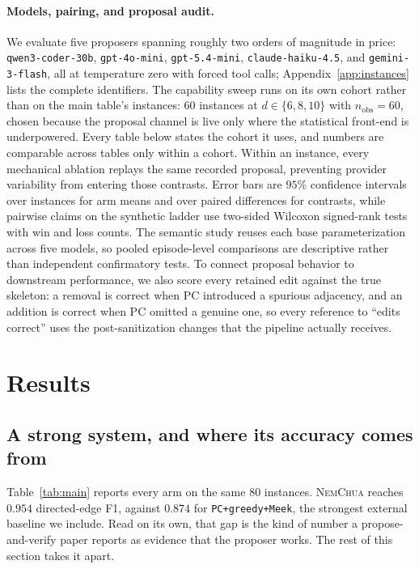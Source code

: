 \documentclass{article}
\newcommand{\nem}{\textsc{NemChua}}
\begin{document}
\paragraph{Models, pairing, and proposal audit.}
We evaluate five proposers spanning roughly two orders of magnitude in price:
\texttt{qwen3-coder-30b}, \texttt{gpt-4o-mini}, \texttt{gpt-5.4-mini},
\texttt{claude-haiku-4.5}, and \texttt{gemini-3-flash}, all at temperature zero with forced tool
calls; Appendix~\ref{app:instances} lists the complete identifiers. The capability sweep runs on its
own cohort rather than on the main table's instances: $60$ instances at $d\in\{6,8,10\}$ with
$n_{\mathrm{obs}}{=}60$, chosen because the proposal channel is live only where the statistical
front-end is underpowered. Every table below states the cohort it uses, and numbers are comparable
across tables only within a cohort. Within an instance, every
mechanical ablation replays the same recorded proposal, preventing provider variability from
entering those contrasts. Error bars are $95\%$ confidence intervals over instances for arm means
and over paired differences for contrasts, while pairwise claims on the synthetic ladder use
two-sided Wilcoxon signed-rank tests with win and loss counts. The semantic study reuses each base
parameterization across five models, so pooled episode-level comparisons are descriptive rather than
independent confirmatory tests. To connect proposal behavior to downstream performance, we also
score every retained edit against the true skeleton: a removal is correct when PC introduced a
spurious adjacency, and an addition is correct when PC omitted a genuine one, so every reference to
``edits correct'' uses the post-sanitization changes that the pipeline actually receives.

\section{Results}
\label{sec:results}

\subsection{A strong system, and where its accuracy comes from}
\label{sec:headline}

Table~\ref{tab:main} reports every arm on the same $80$ instances. \nem{} reaches $0.954$ directed-edge
F1, against $0.874$ for \texttt{PC+greedy+Meek}, the strongest external baseline we include. Read on
its own, that gap is the kind of number a propose-and-verify paper reports as evidence that the
proposer works. The rest of this section takes it apart.
\end{document}
